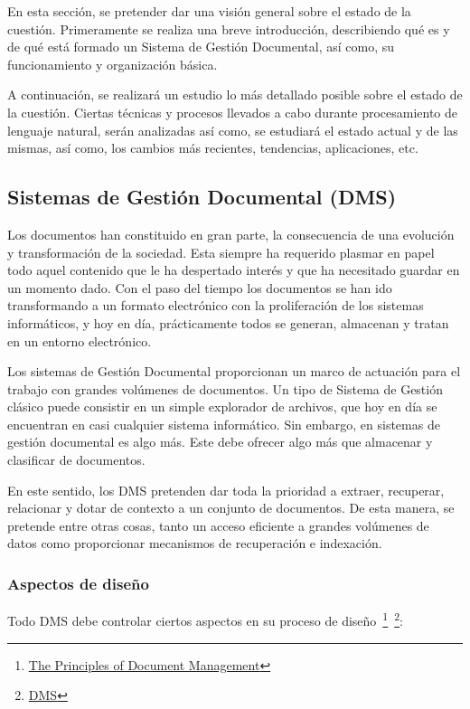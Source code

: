 \documentclass[runningheads,a4paper]{llncs}
\theoremstyle{break}
\begin{document}
En esta sección, se pretender dar una visión general sobre el estado de la cuestión. Primeramente se realiza una breve introducción, describiendo qué es y de qué está formado un Sistema de Gestión Documental, así como, su funcionamiento  y organización básica.

A continuación, se realizará un estudio lo más detallado posible sobre el estado de la cuestión. Ciertas técnicas y procesos llevados a cabo durante procesamiento de lenguaje natural, serán analizadas así como, se estudiará el estado actual y de las mismas, así como, los cambios más recientes, tendencias, aplicaciones, etc.


\subsection{Sistemas de Gestión Documental (DMS)}

Los documentos han constituido en gran parte, la consecuencia de una evolución y transformación de la sociedad. Esta siempre ha requerido plasmar en papel todo aquel contenido que le ha despertado interés y que ha necesitado guardar en un momento dado. Con el paso del tiempo los documentos se han ido transformando a un formato electrónico con la proliferación de los sistemas informáticos, y hoy en día, prácticamente todos se generan, almacenan y tratan en un entorno electrónico.

Los sistemas de Gestión Documental proporcionan un marco de actuación para el trabajo con grandes volúmenes de documentos. Un tipo de Sistema de Gestión clásico puede consistir en un simple explorador de archivos, que hoy en día se encuentran en casi cualquier sistema informático. Sin embargo, en sistemas de gestión documental es algo más. Este debe ofrecer algo más que almacenar y clasificar de documentos.

En este sentido, los DMS pretenden dar toda la prioridad a extraer, recuperar, relacionar y dotar de contexto a un conjunto de documentos. De esta manera, se pretende entre otras cosas, tanto un acceso eficiente a grandes volúmenes de datos como proporcionar mecanismos de recuperación e indexación.


\subsubsection{Aspectos de diseño}
\textbf{}

Todo DMS debe controlar ciertos aspectos en su proceso de diseño~\footnote{ \href{http://www.statetechmagazine.com/sites/default/files/the-principles-of-document-management.pdf}{The Principles of Document Management} }~\footnote{\href{http://samples.sainsburysebooks.co.uk/9781743046593_sample_143621.pdf}{DMS}}:
\end{document}

